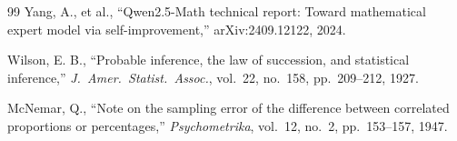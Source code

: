 \documentclass[11pt, a4paper]{article}
\begin{document}
{\begin{thebibliography}{99}
Yang, A., et al., ``Qwen2.5-Math technical report: Toward mathematical expert model via self-improvement,'' arXiv:2409.12122, 2024.

Wilson, E. B., ``Probable inference, the law of succession, and statistical inference,'' \textit{J.\ Amer.\ Statist.\ Assoc.}, vol.~22, no.~158, pp.~209--212, 1927.

McNemar, Q., ``Note on the sampling error of the difference between correlated proportions or percentages,'' \textit{Psychometrika}, vol.~12, no.~2, pp.~153--157, 1947.

\end{thebibliography}}
\end{document}
